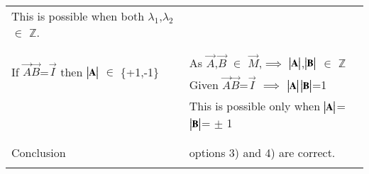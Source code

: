 \documentclass[journal,12pt,twocolumn]{IEEEtran}
\begin{document}
\begin{longtable}{|l|l|}
	This is possible when both $\lambda_1$,$\lambda_2$ $\in$ $\mathbb{Z}$.\\
	& \\
	\hline
	\multirow{3}{*}{If $\vec{A} \vec{B}$=$\vec{I}$ then $\begin{vmatrix}\mathbf{A}\end{vmatrix}$ $\in$ \{+1,-1\}} 
	& \\
	& As $\vec{A}$,$\vec{B}$ $\in$ $\vec{M}$,$\implies$ $\begin{vmatrix}\mathbf{A}\end{vmatrix}$,$\begin{vmatrix}\mathbf{B}\end{vmatrix}$ $\in$ $\mathbb{Z}$ \\
	& Given $\vec{A}\vec{B}$=$\vec{I}$ $\implies$ $\begin{vmatrix}\mathbf{A}\end{vmatrix}\begin{vmatrix}\mathbf{B}\end{vmatrix}$=1\\
	& This is possible only when $\begin{vmatrix}\mathbf{A}\end{vmatrix}$=$\begin{vmatrix}\mathbf{B}\end{vmatrix}$= $\pm$ 1\\
	& \\
	\hline
	\multirow{3}{*}{Conclusion} & \\
	& options 3) and 4) are correct.\\
    & \\
    \hline
\end{longtable}
\end{document}
